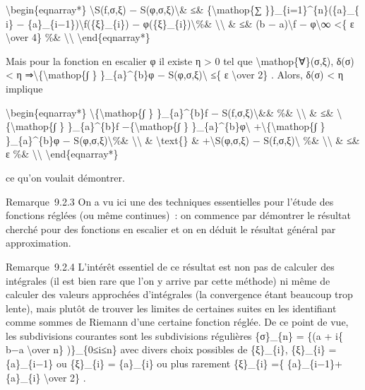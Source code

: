 \documentclass[]{article}
\begin{document}
\textbackslash{}begin\{eqnarray*\} \textbackslash{}\textbar{}S(f,σ,ξ) −
S(φ,σ,ξ)\textbackslash{}\textbar{}\& ≤\& \{\textbackslash{}mathop\{∑
\}\}\_\{i=1\}\^{}\{n\}(\{a\}\_\{ i\} −
\{a\}\_\{i−1\})\textbackslash{}\textbar{}f(\{ξ\}\_\{i\}) −
φ(\{ξ\}\_\{i\})\textbackslash{}\textbar{}\%\&
\textbackslash{}\textbackslash{} \& ≤\& (b −
a)\textbackslash{}\textbar{}f − φ\textbackslash{}\textbar{}∞
\textless{}\{ ε \textbackslash{}over 4\} \%\&
\textbackslash{}\textbackslash{} \textbackslash{}end\{eqnarray*\}

Mais pour la fonction en escalier φ il existe η \textgreater{} 0 tel que
\textbackslash{}mathop\{∀\}(σ,ξ), δ(σ) \textless{} η
⇒\textbackslash{}\textbar{}\{\textbackslash{}mathop\{∫ \}
\}\_\{a\}\^{}\{b\}φ − S(φ,σ,ξ)\textbackslash{}\textbar{} ≤\{ ε
\textbackslash{}over 2\} . Alors, δ(σ) \textless{} η implique

\textbackslash{}begin\{eqnarray*\}
\textbackslash{}\textbar{}\{\textbackslash{}mathop\{∫ \}
\}\_\{a\}\^{}\{b\}f − S(f,σ,ξ)\textbackslash{}\textbar{}\&\& \%\&
\textbackslash{}\textbackslash{} \& ≤\&
\textbackslash{}\textbar{}\{\textbackslash{}mathop\{∫ \}
\}\_\{a\}\^{}\{b\}f −\{\textbackslash{}mathop\{∫ \}
\}\_\{a\}\^{}\{b\}φ\textbackslash{}\textbar{}
+\textbackslash{}\textbar{}\{\textbackslash{}mathop\{∫ \}
\}\_\{a\}\^{}\{b\}φ − S(φ,σ,ξ)\textbackslash{}\textbar{}\%\&
\textbackslash{}\textbackslash{} \& \textbackslash{}text\{\} \&
+\textbackslash{}\textbar{}S(φ,σ,ξ) − S(f,σ,ξ)\textbackslash{}\textbar{}
\%\& \textbackslash{}\textbackslash{} \& ≤\& ε \%\&
\textbackslash{}\textbackslash{} \textbackslash{}end\{eqnarray*\}

ce qu'on voulait démontrer.

Remarque~9.2.3 On a vu ici une des techniques essentielles pour l'étude
des fonctions réglées (ou même continues)~: on commence par démontrer le
résultat cherché pour des fonctions en escalier et on en déduit le
résultat général par approximation.

Remarque~9.2.4 L'intérêt essentiel de ce résultat est non pas de
calculer des intégrales (il est bien rare que l'on y arrive par cette
méthode) ni même de calculer des valeurs approchées d'intégrales (la
convergence étant beaucoup trop lente), mais plutôt de trouver les
limites de certaines suites en les identifiant comme sommes de Riemann
d'une certaine fonction réglée. De ce point de vue, les subdivisions
courantes sont les subdivisions régulières \{σ\}\_\{n\} = \{(a + i\{ b−a
\textbackslash{}over n\} )\}\_\{0≤i≤n\} avec divers choix possibles de
\{ξ\}\_\{i\}, \{ξ\}\_\{i\} = \{a\}\_\{i−1\} ou \{ξ\}\_\{i\} =
\{a\}\_\{i\} ou plus rarement \{ξ\}\_\{i\} =\{
\{a\}\_\{i−1\}+\{a\}\_\{i\} \textbackslash{}over 2\} .
\end{document}
